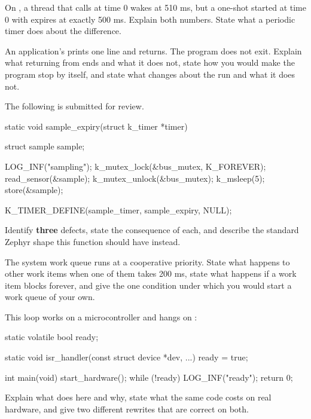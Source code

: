  On , a thread that calls  at time 0 wakes at 510 ms,
but a one-shot  started at time 0 with  expires at exactly 500 ms.
Explain both numbers. State what a periodic timer does about the difference. 

 An application's  prints one line and returns. The program does not exit.
Explain what returning from  ends and what it does not, state how you would make the
program stop by itself, and state what  changes about the run and what it does not.

\label{exa:q:5}

 The following is submitted for review.

\begin{ccode}
static void sample_expiry(struct k_timer *timer)
{
	struct sample sample;

	LOG_INF("sampling");
	k_mutex_lock(&bus_mutex, K_FOREVER);
	read_sensor(&sample);
	k_mutex_unlock(&bus_mutex);
	k_msleep(5);
	store(&sample);
}

K_TIMER_DEFINE(sample_timer, sample_expiry, NULL);
\end{ccode}

\noindent Identify \textbf{three} defects, state the consequence of each, and describe the standard
Zephyr shape this function should have instead. 

 The system work queue runs at a cooperative priority. State what happens to other work
items when one of them takes 200 ms, state what happens if a work item blocks forever, and give the
one condition under which you would start a work queue of your own. 

 This loop works on a microcontroller and hangs on :

\begin{ccode}
static volatile bool ready;

static void isr_handler(const struct device *dev, ...)
{
	ready = true;
}

int main(void)
{
	start_hardware();
	while (!ready) {
	}
	LOG_INF("ready");
	return 0;
}
\end{ccode}

\noindent Explain what  does here and why, state what the same code costs on real
hardware, and give two different rewrites that are correct on both. 

